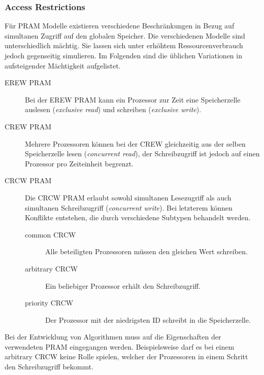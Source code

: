 \subsubsection{Access Restrictions}
Für PRAM Modelle existieren verschiedene Beschränkungen in Bezug auf simultanen Zugriff auf den globalen Speicher.
Die verschiedenen Modelle sind unterschiedlich mächtig. Sie lassen sich unter erhöhtem Ressourcenverbrauch jedoch gegenseitig simulieren.
Im Folgenden sind die üblichen Variationen in aufsteigender Mächtigkeit aufgelistet.
\begin{description}
    \item[EREW PRAM]
        Bei der EREW PRAM kann ein Prozessor zur Zeit eine Speicherzelle auslesen (\emph{exclusive read}) und schreiben (\emph{exclusive write}).
    \item[CREW PRAM]
        Mehrere Prozessoren können bei der CREW gleichzeitig aus der selben Speicherzelle lesen (\emph{concurrent read}), der Schreibzugriff ist jedoch auf einen Prozessor pro Zeiteinheit begrenzt.
    \item[CRCW PRAM]
        Die CRCW PRAM erlaubt sowohl simultanen Lesezugriff als auch simultanen Schreibzugriff (\emph{concurrent write}). Bei letzterem können Konflikte entstehen, die durch verschiedene Subtypen behandelt werden.
        \begin{description}
            \item[common CRCW] Alle beteiligten Prozessoren müssen den gleichen Wert schreiben.
            \item[arbitrary CRCW] Ein beliebiger Prozessor erhält den Schreibzugriff.
            \item[priority CRCW] Der Prozessor mit der niedrigsten ID schreibt in die Speicherzelle.
        \end{description}
\end{description}
Bei der Entwicklung von Algorithmen muss auf die Eigenschaften der verwendeten PRAM eingegangen werden. Beispielsweise darf es bei einem arbitrary CRCW keine Rolle spielen, welcher der Prozessoren in einem Schritt den Schreibzugriff bekommt.
